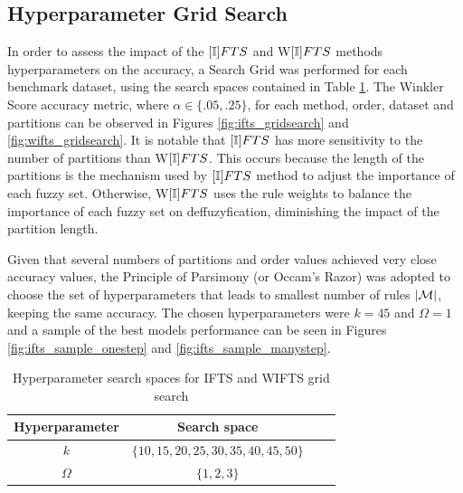 \subsection{Hyperparameter Grid Search}
\label{sec:prob_hyperparameters}

In order to assess the impact of the $[\mathbb{I}]FTS$ and W$[\mathbb{I}]FTS$ methods hyperparameters on the accuracy, a Search Grid was performed for each benchmark dataset, using the search spaces contained in Table \ref{tab:ifts_gridsearch}. The Winkler Score accuracy metric, where  $\alpha \in \{.05,.25\}$, for each method, order, dataset and partitions can be observed in Figures \ref{fig:ifts_gridsearch} and \ref{fig:wifts_gridsearch}. It is notable that $[\mathbb{I}]FTS$ has more sensitivity to the number of partitions than W$[\mathbb{I}]FTS$. This occurs because the length of the partitions is the mechanism used by $[\mathbb{I}]FTS$ method to adjust the importance of each fuzzy set. Otherwise, W$[\mathbb{I}]FTS$ uses the rule weights to balance the importance of each fuzzy set on deffuzyfication, diminishing the impact of the partition length.   

Given that several numbers of partitions and order values achieved very close accuracy values, the Principle of Parsimony (or Occam's Razor) was adopted to choose the set of hyperparameters that leads to smallest number of rules $|\mathcal{M}|$, keeping the same accuracy. The chosen hyperparameters were $k = 45$ and $\Omega = 1$ and a sample of the best models performance can be seen in Figures \ref{fig:ifts_sample_onestep} and \ref{fig:ifts_sample_manystep}.

\begin{table}[htb]
    \centering
    \begin{tabular}{|c|c|c|c|} \hline
        Hyperparameter & Search space  \\ \hline
        $k$ & $\{10, 15, 20, 25, 30, 35, 40, 45, 50\}$  \\ \hline
        $\Omega$ & $\{1, 2, 3\}$ \\ \hline
    \end{tabular}
    \caption{Hyperparameter search spaces for IFTS and WIFTS grid search}
    \label{tab:ifts_gridsearch}
\end{table}

